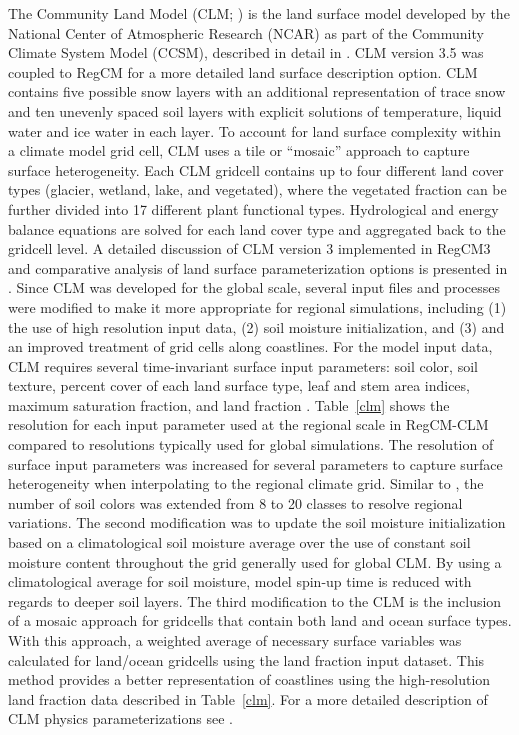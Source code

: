  The Community Land Model (CLM; \cite{Oleson_08})
is the land surface model developed by the National Center of Atmospheric
Research (NCAR) as part of the Community Climate System Model (CCSM), described
in detail in \cite{Collins_06}.  CLM version 3.5 was coupled to RegCM for a more
detailed land surface description option.  CLM contains five possible snow
layers with an additional representation of trace snow and ten unevenly spaced
soil layers with explicit solutions of temperature, liquid water and ice water
in each layer.  To account for land surface complexity within a climate model
grid cell, CLM uses a tile or “mosaic” approach to capture surface
heterogeneity.  Each CLM gridcell contains up to four different land cover types
(glacier, wetland, lake, and vegetated), where the vegetated fraction can be
further divided into 17 different plant functional types.  Hydrological and
energy balance equations are solved for each land cover type and aggregated back
to the gridcell level.  A detailed discussion of CLM version 3 implemented in
RegCM3 and comparative analysis of land surface parameterization options is
presented in \cite{Steiner_09}.  Since CLM was developed for the global scale,
several input files and processes were modified to make it more appropriate for
regional simulations, including (1) the use of high resolution input data, (2)
soil moisture initialization, and (3) and an improved treatment of grid cells
along coastlines.  For the model input data, CLM requires several time-invariant
surface input parameters:  soil color, soil texture, percent cover of each land
surface type, leaf and stem area indices, maximum saturation fraction, and land
fraction \citep{Lawrence_07}.  Table~\ref{clm} shows the resolution for each
input parameter used at the regional scale in RegCM-CLM compared to resolutions
typically used for global simulations.  The resolution of surface input
parameters was increased for several parameters to capture surface heterogeneity
when interpolating to the regional climate grid.  Similar to \cite{Lawrence_07},
the number of soil colors was extended from 8 to 20 classes to resolve regional
variations.  The second modification was to update the soil moisture
initialization based on a climatological soil moisture average
\citep{Giorgi_89b} over the use of constant soil moisture content throughout the
grid generally used for global CLM.  By using a climatological average for soil
moisture, model spin-up time is reduced with regards to deeper soil layers.  The
third modification to the CLM is the inclusion of a mosaic approach for
gridcells that contain both land and ocean surface types.  With this approach, a
weighted average of necessary surface variables was calculated for land/ocean
gridcells using the land fraction input dataset.  This method provides a better
representation of coastlines using the high-resolution land fraction data
described in Table~\ref{clm}.  For a more detailed description of CLM physics
parameterizations see \cite{Oleson_04}.

